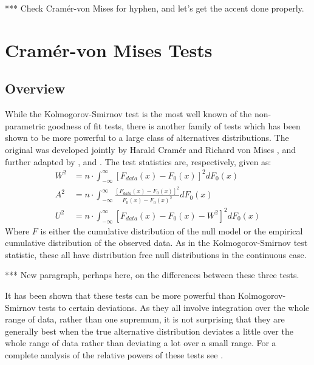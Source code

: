 *** Check Cram\'{e}r-von Mises for hyphen, and let's get the accent done properly.

\section{Cram\'{e}r-von Mises Tests}

\subsection{Overview}

While the Kolmogorov-Smirnov test is the most well known of the non-parametric goodness of fit tests, there is another family of 
tests which has been shown to be more powerful to a large class of alternatives distributions. The original was developed jointly by
Harald Cram\'{e}r and Richard von Mises \citep{cramer1928, vonmises1928}, and further adapted by \cite{anderson1952}, and 
\cite{Watson1961}. The test statistics are, respectively, given as:
\begin{align*}
W^2 &= n \cdot \int_{-\infty}^{\infty} \left[ F_{data}(x)- F_{0}(x) \right]^2 dF_0(x) \\
A^2 &= n \cdot \int_{-\infty}^{\infty} \frac{\left[F_{data}(x)- F_{0}(x) \right]^2}{F_0(x) -F_0(x)^2} dF_0(x) \\
U^2 &= n \cdot \int_{-\infty}^{\infty} \left[ F_{data}(x)- F_{0}(x) - W^2 \right]^2 dF_0(x)
\end{align*}
Where $F$ is either the cumulative distribution of the null model or the empirical cumulative distribution of the observed data.
As in the Kolmogorov-Smirnov test statistic, these all have distribution free null distributions in the continuous case. 

*** New paragraph, perhaps here, on the differences between these three tests.

It has been shown that these tests can be more powerful than Kolmogorov-Smirnov tests to certain deviations. As they all involve
integration over the whole range of data, rather than one supremum, it is not surprising that they are generally best when the
true alternative distribution deviates a little over the whole range of data rather than deviating a lot over a small range. For
a complete analysis of the relative powers of these tests see \cite{stephens1974}.

